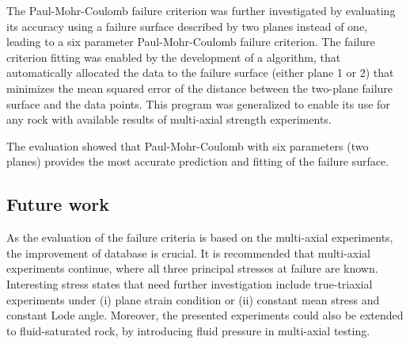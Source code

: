 The Paul-Mohr-Coulomb failure criterion was further investigated by evaluating its accuracy using a failure surface described by two planes instead of one, leading to a six parameter Paul-Mohr-Coulomb failure criterion. The failure criterion fitting was enabled by the development of a algorithm, that automatically allocated the data to the failure surface (either plane 1 or 2) that minimizes the mean squared error of the distance between the two-plane failure surface and the data points. This program was generalized to enable its use for any rock with available results of multi-axial strength experiments. 

The evaluation showed that Paul-Mohr-Coulomb with six parameters (two planes) provides the most accurate prediction and fitting of the failure surface.

\subsection*{Future work}

As the evaluation of the failure criteria is based on the multi-axial experiments, the improvement of database is crucial. It is recommended that multi-axial experiments continue, where all three principal stresses at failure are known. Interesting stress states that need further investigation include true-triaxial experiments under (i) plane strain condition or (ii) constant mean stress and constant Lode angle. Moreover, the presented experiments could also be extended to fluid-saturated rock, by introducing fluid pressure in multi-axial testing.  